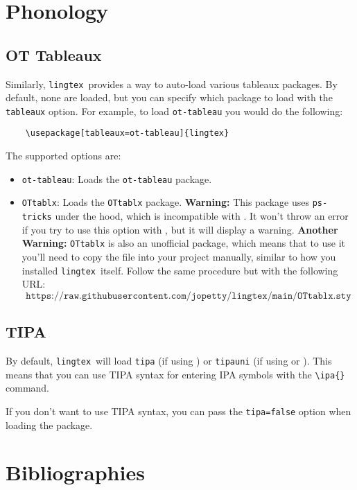 \documentclass{article}
\def\lingtex{\texttt{lingtex}}
\begin{document}
\section{Phonology} \label{sec:phonology}

\subsection{OT Tableaux} \label{ssec:ot-tableaux}

Similarly, \lingtex\ provides a way to auto-load various tableaux packages. By default, none are loaded, but you can specify which package to load with the \verb|tableaux| option. For example, to load \texttt{ot-tableau} you would do the following:
\begin{verbatim}
    \usepackage[tableaux=ot-tableau]{lingtex}
\end{verbatim}
The supported options are:
\begin{itemize}
	\item \verb|ot-tableau|: Loads the \texttt{ot-tableau} package.
	\item \verb|OTtablx|: Loads the \texttt{OTtablx} package. \textbf{Warning:} This package uses \texttt{ps-tricks} under the hood, which is incompatible with . It won't throw an error if you try to use this option with , but it will display a warning. \textbf{Another Warning:} \texttt{OTtablx} is also an unofficial package, which means that to use it you'll need to copy the file into your project manually, similar to how you installed \lingtex\ itself. Follow the same procedure but with the following URL:
	      $$
		      \texttt{https://raw.githubusercontent.com/jopetty/lingtex/main/OTtablx.sty}
	      $$
\end{itemize}

\subsection{TIPA} \label{ssec:tipa}

By default, \lingtex\ will load \texttt{tipa} (if using ) or \texttt{tipauni} (if using  or ). This means that you can use TIPA syntax for entering IPA symbols with the \verb|\ipa{}| command.

If you don't want to use TIPA syntax, you can pass the \verb|tipa=false| option when loading the package.

\section{Bibliographies} \label{sec:bibliographies}
\end{document}
